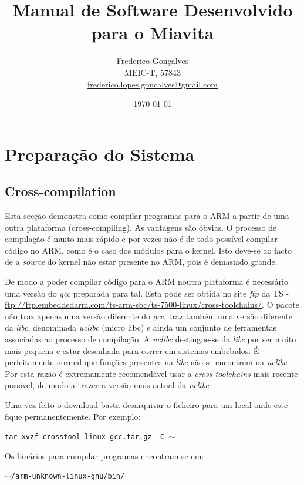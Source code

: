 \documentclass[10pt,a4paper,oneside]{book}
\title{\textbf{Manual de Software Desenvolvido para o Miavita}}
\author{Frederico Gonçalves\\MEIC-T, 57843\\\href{mailto:frederico.lopes.goncalves@gmail.com}{frederico.lopes.goncalves@gmail.com}}
\date{\today}
\begin{document}
\maketitle

\tableofcontents

\chapter{Preparação do Sistema}

\section{Cross-compilation}

Esta secção demonstra como compilar programas para o ARM a partir de uma outra plataforma (cross-compiling). As vantagens são óbvias. O processo de compilação é muito mais rápido e por vezes não é de todo possível compilar código no ARM, como é o caso dos módulos para o kernel. Isto deve-se ao facto de a \emph{source} do kernel não estar presente no ARM, pois é demasiado grande.

De modo a poder compilar código para o ARM noutra plataforma é necessário uma versão do \emph{gcc} preparada para tal. Esta pode ser obtida no site \emph{ftp} da TS - \href{ftp://ftp.embeddedarm.com/ts-arm-sbc/ts-7500-linux/cross-toolchains/}{ftp://ftp.embeddedarm.com/ts-arm-sbc/ts-7500-linux/cross-toolchains/}. O pacote não traz apenas uma versão diferente do \emph{gcc}, traz também uma versão diferente da \emph{libc}, denominada \emph{uclibc} (micro libc) e ainda um conjunto de ferramentas associadas ao processo de compilação. A \emph{uclibc} destingue-se da \emph{libc} por ser muito mais pequena e estar desenhada para correr em sistemas embebidos. É perfeitamente normal que funções presentes na \emph{libc} não se encontrem na \emph{uclibc}. Por esta razão é extremamente recomendável usar a \emph{cross-toolchains} mais recente possível, de modo a trazer a versão mais actual da \emph{uclibc}.

Uma vez feito o download basta desarquivar o ficheiro para um local onde este fique permanentemente. Por exemplo:

\begin{center}
{\tt tar xvzf crosstool-linux-gcc.tar.gz  -C $\sim$}
\end{center}

Os binários para compilar programas encontram-se em:

\begin{center}
{\tt $\sim$/arm-unknown-linux-gnu/bin/}
\end{center}
\end{document}
